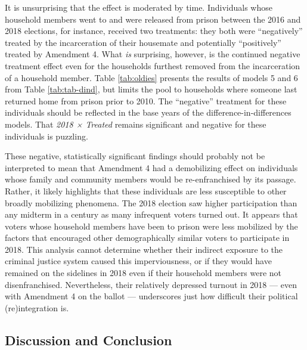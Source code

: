 \documentclass[
  12pt,
]{article}
\begin{document}
It is unsurprising that the effect is moderated by time. Individuals whose household members went to and were released from prison between the 2016 and 2018 elections, for instance, received two treatments: they both were ``negatively'' treated by the incarceration of their housemate and potentially ``positively'' treated by Amendment 4. What \emph{is} surprising, however, is the continued negative treatment effect even for the households furthest removed from the incarceration of a household member. Table \ref{tab:oldies} presents the results of models 5 and 6 from Table \ref{tab:tab-dind}, but limits the pool to households where someone last returned home from prison prior to 2010. The ``negative'' treatment for these individuals should be reflected in the base years of the difference-in-differences models. That \emph{2018 × Treated} remains significant and negative for these individuals is puzzling.

\begin{singlespace}

\end{singlespace}

These negative, statistically significant findings should probably not be interpreted to mean that Amendment 4 had a demobilizing effect on individuals whose family and community members would be re-enfranchised by its passage. Rather, it likely highlights that these individuals are less susceptible to other broadly mobilizing phenomena. The 2018 election saw higher participation than any midterm in a century as many infrequent voters turned out. It appears that voters whose household members have been to prison were less mobilized by the factors that encouraged other demographically similar voters to participate in 2018. This analysis cannot determine whether their indirect exposure to the criminal justice system caused this imperviousness, or if they would have remained on the sidelines in 2018 even if their household members were not disenfranchised. Nevertheless, their relatively depressed turnout in 2018 --- even with Amendment 4 on the ballot --- underscores just how difficult their political (re)integration is.

\hypertarget{discussion-and-conclusion}{%
\subsection*{Discussion and Conclusion}\label{discussion-and-conclusion}}
\end{document}
